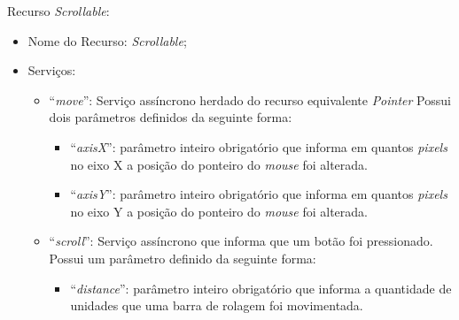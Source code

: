 Recurso \emph{Scrollable}:

\begin{itemize}
	
	\item Nome do Recurso: \emph{Scrollable};

	\item Serviços:
		
		\begin{itemize}

			\item ``\emph{move}'': Serviço assíncrono herdado do recurso equivalente \emph{Pointer} Possui dois parâmetros definidos da seguinte forma:

				\begin{itemize}
					\item ``\emph{axisX}'': parâmetro inteiro obrigatório que informa em quantos \emph{pixels} no eixo X a posição do ponteiro do \emph{mouse} foi alterada.

					\item ``\emph{axisY}'': parâmetro inteiro obrigatório que informa em quantos \emph{pixels} no eixo Y a posição do ponteiro do \emph{mouse} foi alterada.
				\end{itemize}
			
			\item ``\emph{scroll}'': Serviço assíncrono que informa que um botão foi pressionado. Possui um parâmetro definido da seguinte forma:

				\begin{itemize}
					\item ``\emph{distance}'': parâmetro inteiro obrigatório que informa a quantidade de unidades que uma barra de rolagem foi movimentada.
				\end{itemize}

		\end{itemize}
\end{itemize}

